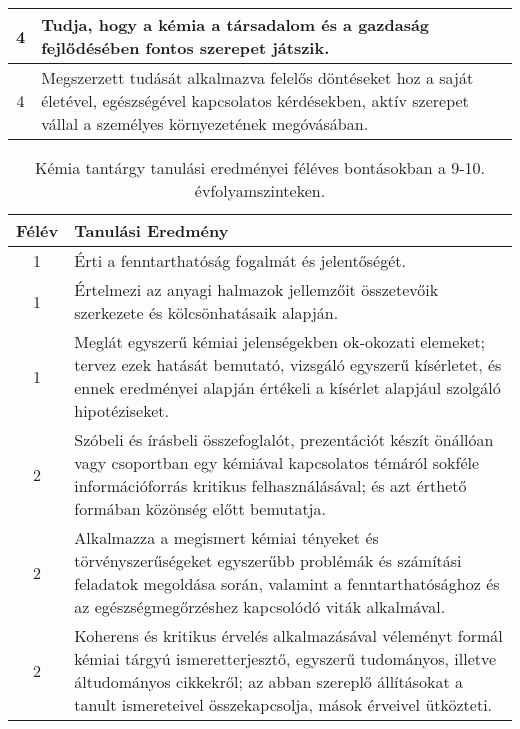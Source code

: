 \begin{longtable}{c | p{12cm} }
                                
                                          4 &  Tudja, hogy a kémia a társadalom és a gazdaság fejlődésében fontos szerepet játszik. \\ \hline
                                          4 &  Megszerzett tudását alkalmazva felelős döntéseket hoz a saját életével, egészségével kapcsolatos kérdésekben, aktív szerepet vállal a személyes környezetének megóvásában. \\ \hline
                                      
                        \end{longtable}
            \clearpage

       
           \begin{longtable}{c | p{12cm} }
            \caption[Kémia 9-10.]{Kémia tantárgy tanulási eredményei féléves bontásokban a 9-10. évfolyamszinteken. }  \\

            \textbf{Félév} & \textbf{Tanulási Eredmény} \\
            \hline
            \endhead
                                
                                          1 &  Érti a fenntarthatóság fogalmát és jelentőségét. \\ \hline
                                          1 &  Értelmezi az anyagi halmazok jellemzőit összetevőik szerkezete és kölcsönhatásaik alapján. \\ \hline
                                          1 &  Meglát egyszerű kémiai jelenségekben ok-okozati elemeket; tervez ezek hatását bemutató, vizsgáló egyszerű kísérletet, és ennek eredményei alapján értékeli a kísérlet alapjául szolgáló hipotéziseket. \\ \hline
                                      
                                
                                          2 &  Szóbeli és írásbeli összefoglalót, prezentációt készít önállóan vagy csoportban egy kémiával kapcsolatos témáról sokféle információforrás kritikus felhasználásával; és azt érthető formában közönség előtt bemutatja. \\ \hline
                                          2 &  Alkalmazza a megismert kémiai tényeket és törvényszerűségeket egyszerűbb problémák és számítási feladatok megoldása során, valamint a fenntarthatósághoz és az egészségmegőrzéshez kapcsolódó viták alkalmával. \\ \hline
                                          2 &  Koherens és kritikus érvelés alkalmazásával véleményt formál kémiai tárgyú ismeretterjesztő, egyszerű tudományos, illetve áltudományos cikkekről; az abban szereplő állításokat a tanult ismereteivel összekapcsolja, mások érveivel ütközteti. \\ \hline
                                      

\end{longtable}
